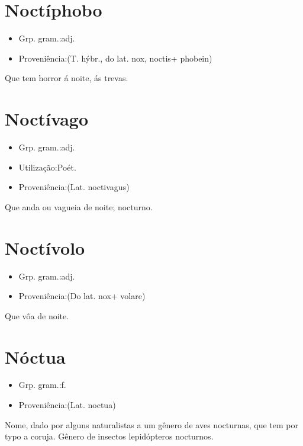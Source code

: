 \section{Noctíphobo}
\begin{itemize}
\item {Grp. gram.:adj.}
\end{itemize}
\begin{itemize}
\item {Proveniência:(T. hýbr., do lat. \textunderscore nox\textunderscore , \textunderscore noctis\textunderscore  + \textunderscore phobein\textunderscore )}
\end{itemize}
Que tem horror á noite, ás trevas.
\section{Noctívago}
\begin{itemize}
\item {Grp. gram.:adj.}
\end{itemize}
\begin{itemize}
\item {Utilização:Poét.}
\end{itemize}
\begin{itemize}
\item {Proveniência:(Lat. \textunderscore noctivagus\textunderscore )}
\end{itemize}
Que anda ou vagueia de noite; nocturno.
\section{Noctívolo}
\begin{itemize}
\item {Grp. gram.:adj.}
\end{itemize}
\begin{itemize}
\item {Proveniência:(Do lat. \textunderscore nox\textunderscore  + \textunderscore volare\textunderscore )}
\end{itemize}
Que vôa de noite.
\section{Nóctua}
\begin{itemize}
\item {Grp. gram.:f.}
\end{itemize}
\begin{itemize}
\item {Proveniência:(Lat. \textunderscore noctua\textunderscore )}
\end{itemize}
Nome, dado por alguns naturalistas a um gênero de aves nocturnas, que tem por typo a coruja.
Gênero de insectos lepidópteros nocturnos.
